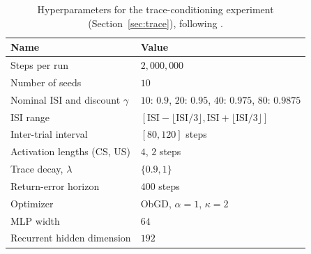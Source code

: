 \documentclass{article}
\begin{document}
\begin{table}[htbp]
\centering
\caption{Hyperparameters for the trace-conditioning experiment (Section~\ref{sec:trace}), following \citet{rafiee2022eye}.}
\label{tab:hparams-trace}
\begin{tabular}{ll}
\toprule
Name & Value \\
\midrule
Steps per run                          & $2{,}000{,}000$ \\
Number of seeds                        & $10$ \\
Nominal ISI and discount $\gamma$      & $10$: $0.9$, $20$: $0.95$, $40$: $0.975$, $80$: $0.9875$ \\
ISI range                              & $[\mathrm{ISI} - \lfloor \mathrm{ISI}/3 \rfloor, \mathrm{ISI} + \lfloor \mathrm{ISI}/3 \rfloor]$ \\
Inter-trial interval                   & $[80, 120]$ steps \\
Activation lengths (CS, US)            & $4$, $2$ steps \\
Trace decay, $\lambda$                 & $\{0.9, 1\}$ \\
Return-error horizon                   & $400$ steps \\
Optimizer                              & ObGD, $\alpha = 1$, $\kappa = 2$ \\
MLP width                              & $64$ \\
Recurrent hidden dimension             & $192$ \\
\bottomrule
\end{tabular}
\end{table}
\end{document}
